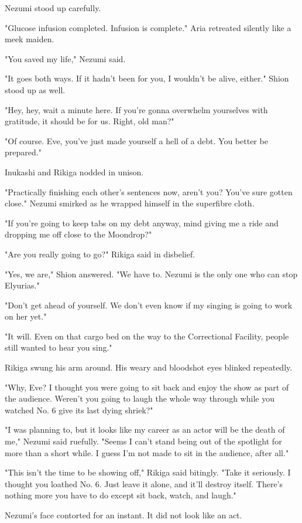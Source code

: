 Nezumi stood up carefully.

{\sffamily "Glucose infusion completed. Infusion is complete."} Aria retreated
silently like a meek maiden.

"You saved my life," Nezumi said.

"It goes both ways. If it hadn't been for you, I wouldn't be alive,
either." Shion stood up as well.

"Hey, hey, wait a minute here. If you're gonna overwhelm yourselves with
gratitude, it should be for us. Right, old man?"

"Of course. Eve, you've just made yourself a hell of a debt. You better
be prepared."

Inukashi and Rikiga nodded in unison.

"Practically finishing each other's sentences now, aren't you? You've
sure gotten close." Nezumi smirked as he wrapped himself in the
superfibre cloth.

"If you're going to keep tabs on my debt anyway, mind giving me a ride
and dropping me off close to the Moondrop?"

"Are you really going to go?" Rikiga said in disbelief.

"Yes, we are," Shion answered. "We have to. Nezumi is the only one who
can stop Elyurias."

"Don't get ahead of yourself. We don't even know if my singing is going
to work on her yet."

"It will. Even on that cargo bed on the way to the Correctional
Facility, people still wanted to hear you sing."

Rikiga swung his arm around. His weary and bloodshot eyes blinked
repeatedly.

"Why, Eve? I thought you were going to sit back and enjoy the show as
part of the audience. Weren't you going to laugh the whole way through
while you watched No. 6 give its last dying shriek?"

"I was planning to, but it looks like my career as an actor will be the
death of me," Nezumi said ruefully. "Seems I can't stand being out of
the spotlight for more than a short while. I guess I'm not made to sit
in the audience, after all."

"This isn't the time to be showing off," Rikiga said bitingly. "Take it
seriously. I thought you loathed No. 6. Just leave it alone, and it'll
destroy itself. There's nothing more you have to do except sit back,
watch, and laugh."

Nezumi's face contorted for an instant. It did not look like an act.

